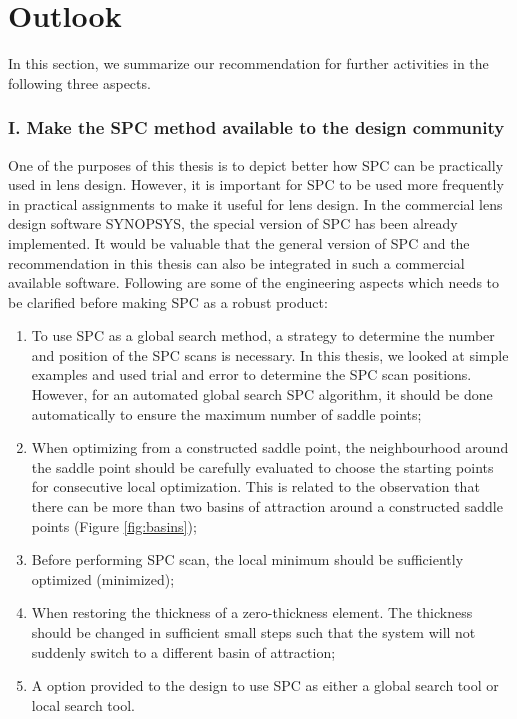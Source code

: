 \newpage

\section{Outlook}
In this section, we summarize our recommendation for further activities in the following three aspects.

\subsubsection{I. Make the SPC method available to the design community}

One of the purposes of this thesis is to depict better how SPC can be practically used in lens design. However, it is important for SPC to be used more frequently in practical assignments to make it useful for lens design. In the commercial lens design software SYNOPSYS\texttrademark \cite{SYNOPSYSSW}, the special version of SPC has been already implemented. It would be valuable that the general version of SPC and the recommendation in this thesis can also be integrated in such a commercial available software. Following are some of the engineering aspects which needs to be clarified before making SPC as a robust product:
\begin{enumerate}[nosep]
\item To use SPC as a global search method, a strategy to determine the number and position of the SPC scans is necessary. In this thesis, we looked at simple examples and used trial and error to determine the SPC scan positions. However, for an automated global search SPC algorithm, it should be done automatically to ensure the maximum number of saddle points;
\item When optimizing from a constructed saddle point, the neighbourhood around the saddle point should be carefully evaluated to choose the starting points for consecutive local optimization. This is related to the observation that there can be more than two basins of attraction around a constructed saddle points (Figure \ref{fig:basins});
\item Before performing SPC scan, the local minimum should be sufficiently optimized (minimized); 
\item When restoring the thickness of a zero-thickness element. The thickness should be changed in sufficient small steps such that the system will not suddenly switch to a different basin of attraction; 
\item  A option provided to the design to use SPC as either a global search tool or local search tool. 
\end{enumerate}


